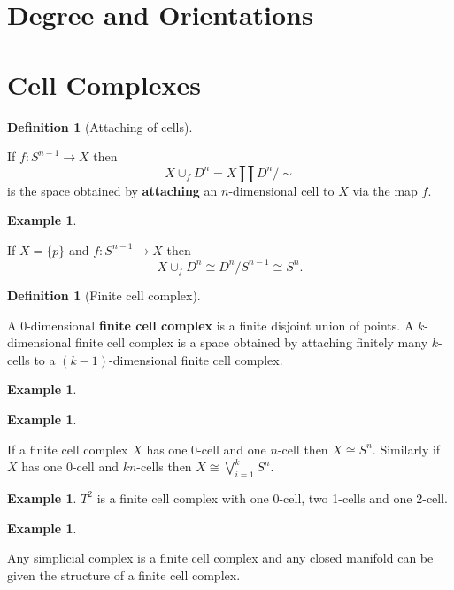 \documentclass[10pt,]{book}
\newcommand{\terminology}[1]{\textbf{#1}}
\theoremstyle{plain}
\theoremstyle{definition}
\newtheorem{definition}[theorem]{Definition}
\newtheorem{example}[theorem]{Example}
\numberwithin{equation}{section}
\begin{document}
\section[Degree and Orientations]{Degree and Orientations}\label{sec-degrees}
\typeout{************************************************}
\typeout{************************************************}
\section[Cell Complexes]{Cell Complexes}\label{sec-cell-complexes}
\begin{definition}[Attaching of cells]\label{definition-19}

            If \(f\colon S^{n-1} \to X\) then
            \[
              X\cup_f D^n = X\amalg D^n/\sim
            \]
            is the space obtained by \terminology{attaching} an \(n\)-dimensional cell to \(X\) via the map \(f\).
          \end{definition}
\begin{example}\label{example-16}

            If \(X = \{p\}\) and \(f\colon S^{n-1} \to X\) then
            \[
              X\cup_f D^n\cong D^n/S^{n-1} \cong S^n.
            \]\end{example}
\begin{definition}[Finite cell complex]\label{definition-20}

            A 0-dimensional \terminology{finite cell complex} is a finite disjoint union of points.
            \newline{}
            A \(k\)-dimensional finite cell complex is a space obtained by attaching finitely many \(k\)-cells to a \((k-1)\)-dimensional finite cell complex.
          \end{definition}
\begin{example}\label{example-17}
\end{example}
\begin{example}\label{example-18}

            If a finite cell complex \(X\) has one 0-cell and one \(n\)-cell then \(X \cong S^n\).
            Similarly if \(X\) has one 0-cell and \(k\)\(n\)-cells then \(X \cong \bigvee_{i=1}^{k}S^n\).
          \end{example}
\begin{example}\label{example-19}
\(T^2\) is a finite cell complex with one 0-cell, two 1-cells and one 2-cell.\end{example}
\begin{example}\label{example-20}

            Any simplicial complex is a finite cell complex and any closed manifold can be given the structure of a finite cell complex.
          \end{example}
\typeout{************************************************}
\typeout{************************************************}
\end{document}

